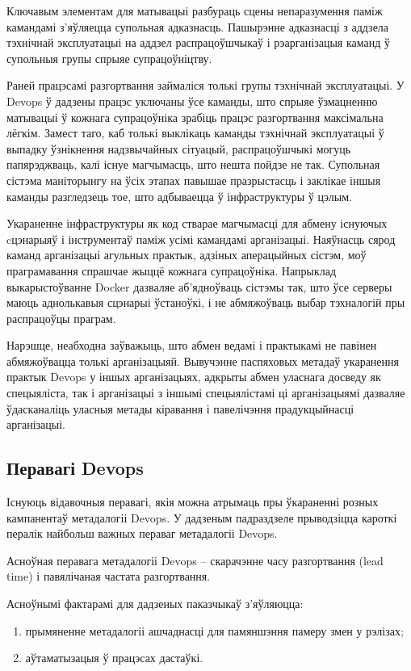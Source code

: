 Ключавым элементам для матывацыі разбураць сцены непаразумення
паміж камандамі з'яўляецца супольная адказнасць.
Пашырэнне адказнасці з аддзела тэхнічнай эксплуатацыі 
на аддзел распрацоўшчыкаў і рэарганізацыя каманд
ў супольныя групы %
спрыяе супрацоўніцтву.

Раней працэсамі разгортвання займаліся толькі групы
тэхнічнай эксплуатацыі.
У Devops ў дадзены працэс уключаны ўсе каманды, што
спрыяе ўзмацненню матывацыі ў кожнага супрацоўніка
зрабіць працэс разгортвання максімальна лёгкім.
Замест таго, каб толькі выклікаць каманды тэхнічнай
эксплуатацыі ў выпадку ўзнікнення надзвычайных сітуацый,
распрацоўшчыкі могуць папярэджваць, калі існуе магчымасць,
што нешта пойдзе не так.
Супольная сістэма маніторынгу на ўсіх этапах павышае празрыстасць і
заклікае іншыя каманды разгледзець тое, што адбываецца ў
інфраструктуры ў цэлым.

Укараненне інфраструктуры як код стварае магчымасці для абмену
існуючых cцэнарыяў і інструментаў паміж усімі камандамі арганізацыі.
Наяўнасць сярод каманд арганізацыі агульных практык,
адзіных аперацыйных сістэм, моў праграмавання спрашчае жыццё кожнага
супрацоўніка.
Напрыклад выкарыстоўванне Docker дазваляе аб'ядноўваць сістэмы так, што
ўсе серверы маюць аднолькавыя сцэнарыі ўстаноўкі, і не абмяжоўваць выбар
тэхналогій пры распрацоўцы праграм.

Нарэшце, неабходна заўважыць, што абмен ведамі і практыкамі не павінен
абмяжоўвацца толькі арганізацыяй.
Вывучэнне паспяховых метадаў укаранення практык Devops у іншых
арганізацыях, адкрыты абмен уласнага досведу як спецыяліста,
так і арганізацыі з іншымі спецыялістамі ці арганізацыямі
дазваляе ўдасканаліць уласныя метады кіравання і
павелічэння прадукцыйнасці арганізацыі.

\subsection{Перавагі Devops}
Існуюць відавочныя перавагі, якія можна атрымаць пры
ўкараненні розных кампанентаў метадалогіі Devops.
У дадзеным падраздзеле прыводзіцца кароткі пералік
найбольш важных пераваг метадалогіі Devops.

Асноўная перавага метадалогіі Devops -- скарачэнне часу
разгортвання (lead time) і павялічаная частата
разгортвання.

Асноўнымі фактарамі для дадзеных паказчыкаў з'яўляюцца:
\begin{enumerate}
    \item прымяненне метадалогіі ашчаднасці для памяншэння памеру
змен у рэлізах;
    \item аўтаматызацыя ў працэсах дастаўкі.
\end{enumerate}

